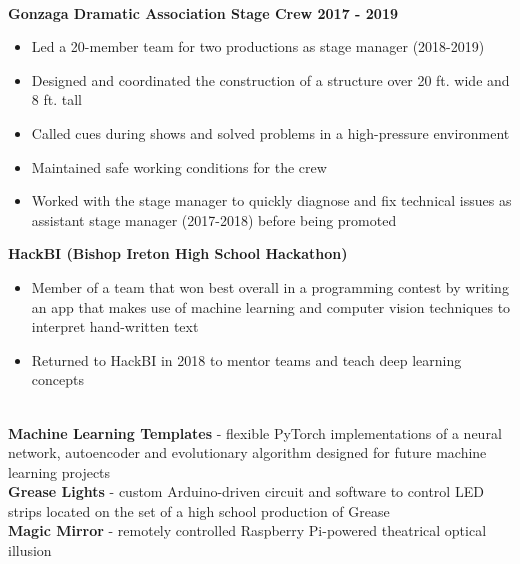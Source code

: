\documentclass{article}
\begin{document}
\begin{center}
\begin{flushleft}
    {\large\textbf{\underline{}}} \\
    \textbf{Gonzaga Dramatic Association Stage Crew \hfill 2017 - 2019}
    \begin{itemize}
      \item Led a 20-member team for two productions as stage manager (2018-2019)
      \item Designed and coordinated the construction of a structure over 20 ft. wide and 8 ft. tall
      \item Called cues during shows and solved problems in a high-pressure environment
      \item Maintained safe working conditions for the crew
      \item Worked with the stage manager to quickly diagnose and fix technical issues as assistant stage manager (2017-2018) before being promoted
    \end{itemize}

    \textbf{HackBI  (Bishop Ireton High School Hackathon)}

    \begin{itemize}
      \item Member of a team that won best overall in a programming contest by writing an app that makes use of machine learning and computer vision techniques to interpret hand-written text
      \item Returned to HackBI in 2018 to mentor teams and teach deep learning concepts
    \end{itemize}

    {\large\textbf{\underline{}}} \\
    \textbf{Machine Learning Templates} - flexible PyTorch implementations of a neural network, autoencoder and evolutionary algorithm designed for future machine learning projects \\
    \textbf{Grease Lights} - custom Arduino-driven circuit and software to control LED strips located on the set of a high school production of Grease \\
    \textbf{Magic Mirror} - remotely controlled Raspberry Pi-powered theatrical optical illusion



  \end{flushleft}
  \end{center}
\end{document}
